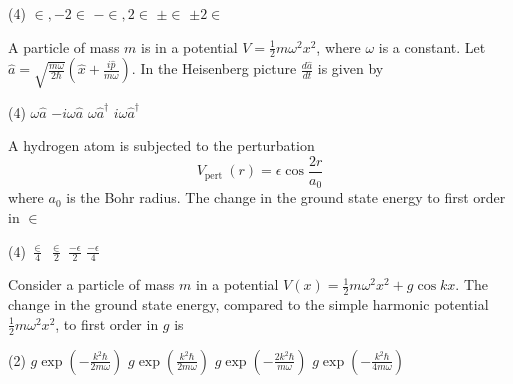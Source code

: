 \begin{enumerate}
\begin{minipage}{\textwidth}
\end{minipage}
\begin{tasks}(4)
	\task[\textbf{A.}] $\in,-2 \in$
	\task[\textbf{B.}] $-\in, 2 \in$
	\task[\textbf{C.}]$\pm \in$
	\task[\textbf{D.}]$\pm 2 \in$
\end{tasks}
\begin{minipage}{\textwidth}
	\item A particle of mass $m$ is in a potential $V=\frac{1}{2} m \omega^{2} x^{2}$, where $\omega$ is a constant. Let $\hat{a}=\sqrt{\frac{m \omega}{2 \hbar}}\left(\hat{x}+\frac{i \hat{p}}{m \omega}\right) .$ In the Heisenberg picture $\frac{d \hat{a}}{d t}$ is given by
\end{minipage}
\begin{tasks}(4)
	\task[\textbf{A.}] $\omega \hat{a}$
	\task[\textbf{B.}]$-i \omega \hat{a}$
	\task[\textbf{C.}]$\omega \hat{a}^{\dagger}$
	\task[\textbf{D.}]$i \omega \hat{a}^{\dagger}$
\end{tasks}
\begin{minipage}{\textwidth}
	\item A hydrogen atom is subjected to the perturbation
	$$
	V_{\text {pert }}(r)=\epsilon \cos \frac{2 r}{a_{0}}
	$$
	where $a_{0}$ is the Bohr radius. The change in the ground state energy to first order in $\in$
\end{minipage}
\begin{tasks}(4)
	\task[\textbf{A.}] $\frac{\in}{4}$
	\task[\textbf{B.}] $\frac{\in}{2}$
	\task[\textbf{C.}]$\frac{-\epsilon}{2}$
	\task[\textbf{D.}] $\frac{-\epsilon}{4}$
\end{tasks}
\begin{minipage}{\textwidth}
	\item Consider a particle of mass $m$ in a potential $V(x)=\frac{1}{2} m \omega^{2} x^{2}+g \cos k x .$ The change in the ground state energy, compared to the simple harmonic potential $\frac{1}{2} m \omega^{2} x^{2}$, to first order in $g$ is
\end{minipage}
\begin{tasks}(2)
	\task[\textbf{A.}] $g \exp \left(-\frac{k^{2} \hbar}{2 m \omega}\right)$
	\task[\textbf{B.}]$g \exp \left(\frac{k^{2} \hbar}{2 m \omega}\right)$
	\task[\textbf{C.}]$g \exp \left(-\frac{2 k^{2} \hbar}{m \omega}\right)$
	\task[\textbf{D.}] $g \exp \left(-\frac{k^{2} \hbar}{4 m \omega}\right)$
\end{tasks}
\begin{minipage}{\textwidth}

\end{minipage}
\end{enumerate}
